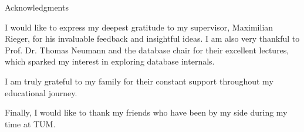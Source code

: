 \thispagestyle{empty}

\vspace*{20mm}

\begin{center}
  {
    Acknowledgments} \end{center}

\vspace{10mm}

\noindent I would like to express my deepest gratitude to my supervisor, Maximilian Rieger, for his invaluable feedback and insightful ideas.
I am also very thankful to Prof.
Dr.
Thomas Neumann and the database chair for their excellent lectures, which sparked my interest in exploring database internals.

I am truly grateful to my family for their constant support throughout my educational journey.

Finally, I would like to thank my friends who have been by my side during my time at TUM.

\cleardoublepage{}
